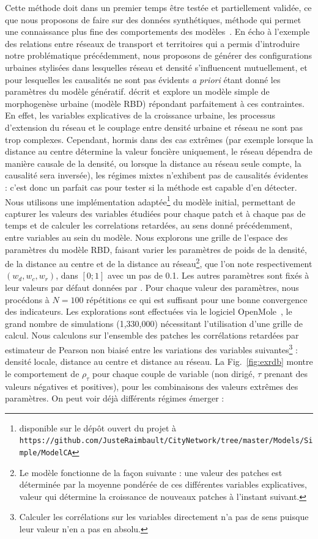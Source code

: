 \documentclass[french]{./sageo}
\begin{document}
Cette méthode doit dans un premier temps être testée et partiellement validée, ce que nous proposons de faire sur des données synthétiques, méthode qui permet une connaissance plus fine des comportements des modèles~\cite{raimbault2016generation}. En écho à l'exemple des relations entre réseaux de transport et territoires qui a permis d'introduire notre problématique précédemment, nous proposons de générer des configurations urbaines stylisées dans lesquelles réseau et densité s'influencent mutuellement, et pour lesquelles les causalités ne sont pas évidents \emph{a priori} étant donné les paramètres du modèle génératif. \cite{raimbault2014hybrid} décrit et explore un modèle simple de morphogenèse urbaine (modèle RBD) répondant parfaitement à ces contraintes. En effet, les variables explicatives de la croissance urbaine, les processus d'extension du réseau et le couplage entre densité urbaine et réseau ne sont pas trop complexes. Cependant, hormis dans des cas extrêmes (par exemple lorsque la distance au centre détermine la valeur foncière uniquement, le réseau dépendra de manière causale de la densité, ou lorsque la distance au réseau seule compte, la causalité sera inversée), les régimes mixtes n'exhibent pas de causalités évidentes : c'est donc un parfait cas pour tester si la méthode est capable d'en détecter. Nous utilisons une implémentation adaptée\footnote{disponible sur le dépôt ouvert du projet à\\\texttt{https://github.com/JusteRaimbault/CityNetwork/tree/master/Models/Simple/ModelCA}} du modèle initial, permettant de capturer les valeurs des variables étudiées pour chaque patch et à chaque pas de temps et de calculer les correlations retardées, au sens donné précédemment, entre variables au sein du modèle. Nous explorons une grille de l'espace des paramètres du modèle RBD, faisant varier les paramètres de poids de la densité, de la distance au centre et de la distance au réseau\footnote{Le modèle fonctionne de la façon suivante : une valeur des patches est déterminée par la moyenne pondérée de ces différentes variables explicatives, valeur qui détermine la croissance de nouveaux patches à l'instant suivant.}, que l'on note respectivement $(w_{d},w_{c},w_{r})$, dans $\left[0;1\right]$ avec un pas de 0.1. Les autres paramètres sont fixés à leur valeurs par défaut données par \cite{raimbault2014hybrid}. Pour chaque valeur des paramètres, nous procédons à $N=100$ répétitions ce qui est suffisant pour une bonne convergence des indicateurs. Les explorations sont effectuées via le logiciel OpenMole~\cite{reuillon2013openmole}, le grand nombre de simulations (1,330,000) nécessitant l'utilisation d'une grille de calcul. Nous calculons sur l'ensemble des patches les corrélations retardées par estimateur de Pearson non biaisé entre les variations des variables suivantes\footnote{Calculer les corrélations sur les variables directement n'a pas de sens puisque leur valeur n'en a pas en absolu.} : densité locale, distance au centre et distance au réseau. La Fig.~\ref{fig:exrdb} montre le comportement de $\rho_{\tau}$ pour chaque couple de variable (non dirigé, $\tau$ prenant des valeurs négatives et positives), pour les combinaisons des valeurs extrêmes des paramètres. On peut voir déjà différents régimes émerger : 
\end{document}
